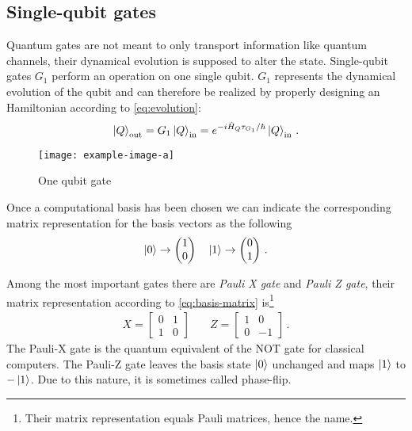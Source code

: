 \subsection{Single-qubit gates}
Quantum gates are not meant to only transport information like quantum channels, their dynamical evolution is supposed to alter the state.
Single-qubit gates $G_1$ perform an operation on one single qubit. $G_1$ represents the dynamical evolution of the qubit and can therefore be realized by properly designing an Hamiltonian according to \eqref{eq:evolution}:
\begin{equation*}
   \ket{Q}_\textup{out} = G_1\ket{Q}_\textup{in} = e^{-i\hat{H}_Q \tau_{G_1}/\hbar}\ket{Q}_\textup{in}\,.
\end{equation*}
\begin{figure}[htb]
\centering
\texttt{[image: example-image-a]}
\caption{One qubit gate}
\label{fig:single-qubit-gate}
\end{figure}


Once a computational basis has been chosen we can indicate the corresponding matrix representation for the basis vectors as the following
\begin{equation}\label{eq:basis-matrix}
    \ket{0} \rightarrow \begin{pmatrix} 1 \\ 0 \end{pmatrix} \quad \ket{1} \rightarrow \begin{pmatrix} 0 \\ 1 \end{pmatrix}\,.
\end{equation}

Among the most important gates there are \emph{Pauli X gate} and \emph{Pauli Z gate}, their matrix representation according to \ref{eq:basis-matrix} is\footnote{Their matrix representation equals Pauli matrices, hence the name.}
\begin{align*}
    X = 
    \begin{bmatrix}
    0 & 1\\
    1 & 0
    \end{bmatrix} 
    \quad &
     Z = 
    \begin{bmatrix}
    1 & 0\\
    0 & -1
    \end{bmatrix}\,.
\end{align*}
The Pauli-X gate is the quantum equivalent of the NOT gate for classical computers. 
The Pauli-Z gate leaves the basis state $\ket{0}$  unchanged and maps $\ket{1}$  to $-\ket{1}$. Due to this nature, it is sometimes called phase-flip. 
